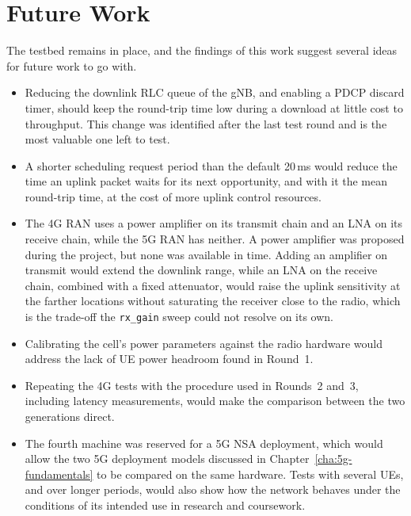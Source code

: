 \section{Future Work}
\label{sec:conclusions-future}

The testbed remains in place, and the findings of this work suggest several ideas for future work to go with.

\begin{itemize}
    \item Reducing the downlink \gls{RLC} queue of the \gls{gNB}, and enabling a \gls{PDCP} discard timer, should keep the round-trip time low during a download at little cost to throughput. This change was identified after the last test round and is the most valuable one left to test.

    \item A shorter scheduling request period than the default 20\,ms would reduce the time an uplink packet waits for its next opportunity, and with it the mean round-trip time, at the cost of more uplink control resources.

    \item The 4G \gls{RAN} uses a power amplifier on its transmit chain and an \gls{LNA} on its receive chain, while the 5G \gls{RAN} has neither. A power amplifier was proposed during the project, but none was available in time. Adding an amplifier on transmit would extend the downlink range, while an \gls{LNA} on the receive chain, combined with a fixed attenuator, would raise the uplink sensitivity at the farther locations without saturating the receiver close to the radio, which is the trade-off the \texttt{rx\_gain} sweep could not resolve on its own.

    \item Calibrating the cell's power parameters against the radio hardware would address the lack of \gls{UE} power headroom found in Round~1.

    \item Repeating the 4G tests with the procedure used in Rounds~2 and~3, including latency measurements, would make the comparison between the two generations direct.

    \item The fourth machine was reserved for a 5G \gls{NSA} deployment, which would allow the two 5G deployment models discussed in Chapter~\ref{cha:5g-fundamentals} to be compared on the same hardware. Tests with several \glspl{UE}, and over longer periods, would also show how the network behaves under the conditions of its intended use in research and coursework.
\end{itemize}
